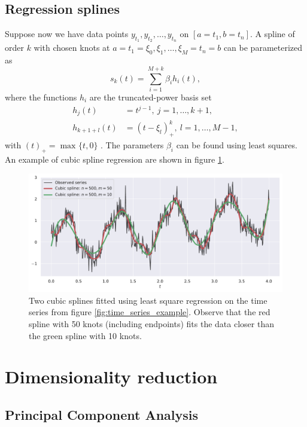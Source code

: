 \documentclass[a4paper]{memoir}
\theoremstyle{plain}
\theoremstyle{definition}
\theoremstyle{remark}
\begin{document}
\subsection{Regression splines}
Suppose now we have data points $y_{t_1}, y_{t_2}, \hdots, y_{t_n}$ on $[a = t_1, b = t_n]$. 
A spline of order $k$ with chosen knots at $a = t_1 = \xi_0, \xi_1, \hdots, \xi_{M} = t_n = b$ can be parameterized as 
\begin{equation}\label{eq:lsq_spline}
        s_k(t) = \sum_{i = 1}^{M + k} \beta_i h_i(t),
\end{equation}
where the functions $h_i$ are the truncated-power basis set
\begin{align*}
        h_j(t) &= t^{j - 1}, \ j = 1, \hdots, k+1, \\
        h_{k+1+l}(t) &= (t - \xi_l)_+^k, \ l = 1, \hdots, M-1,
\end{align*}
with $(t)_+ = \max_{} \{ t, 0 \}$ \cite{hastie}.
The parameters $\beta_i$ can be found using least squares.
An example of cubic spline regression are shown in figure \ref{fig:cubic_splines}.

\begin{figure}[tb ]
        \centering
        \includegraphics[width=\linewidth]{./code/figures/cubic_splines.pdf}
        \caption{Two cubic splines fitted using least square regression on the time series from figure \ref{fig:time_series_example}.
        Observe that the red spline with 50 knots (including endpoints) fits the data closer than the green spline with 10 knots.}
        \label{fig:cubic_splines}
\end{figure}




\section{Dimensionality reduction}
\subsection{Principal Component Analysis}
\end{document}
